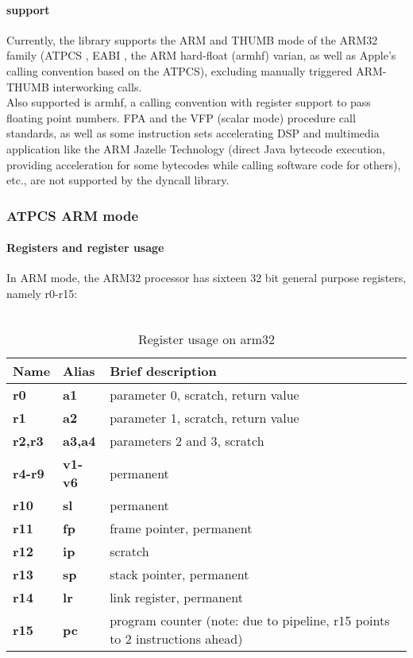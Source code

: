 \paragraph{ support}

Currently, the  library supports the ARM and THUMB mode of the
ARM32 family (ATPCS \cite{ATPCS}, EABI \cite{armeabi}, the ARM hard-float
(armhf) \cite{armeabi} varian, as well as Apple's calling convention based on
the ATPCS), excluding manually triggered ARM-THUMB interworking calls.\\
Also supported is armhf, a calling convention with register support to pass
floating point numbers. FPA and the VFP (scalar mode) procedure call standards,
as well as some instruction sets accelerating DSP and multimedia application
like the ARM Jazelle Technology (direct Java bytecode execution, providing
acceleration for some bytecodes while calling software code for others), etc.,
are not supported by the dyncall library.\\


\subsubsection{ATPCS ARM mode}


\paragraph{Registers and register usage}

In ARM mode, the ARM32 processor has sixteen 32 bit general purpose registers, namely r0-r15:\\
\\
\begin{table}[h]
\begin{tabular*}{0.95\textwidth}{lll}
Name        & Alias       & Brief description\\
\hline
{\bf r0}    & {\bf a1}    & parameter 0, scratch, return value\\
{\bf r1}    & {\bf a2}    & parameter 1, scratch, return value\\
{\bf r2,r3} & {\bf a3,a4} & parameters 2 and 3, scratch\\
{\bf r4-r9} & {\bf v1-v6} & permanent\\
{\bf r10}   & {\bf sl}    & permanent\\
{\bf r11}   & {\bf fp}    & frame pointer, permanent\\
{\bf r12}   & {\bf ip}    & scratch\\
{\bf r13}   & {\bf sp}    & stack pointer, permanent\\
{\bf r14}   & {\bf lr}    & link register, permanent\\
{\bf r15}   & {\bf pc}    & program counter (note: due to pipeline, r15 points to 2 instructions ahead)\\
\end{tabular*}
\caption{Register usage on arm32}
\end{table}

